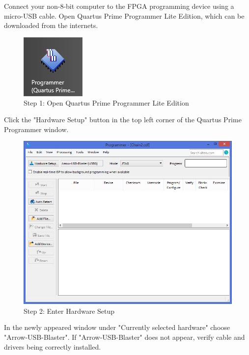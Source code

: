 Connect your non-8-bit computer to the FPGA programming device using a micro-USB cable.
Open Quartus Prime Programmer Lite Edition, which can be downloaded from the internets.

\begin{figure}
  \includegraphics{images/max10_01.png}
  \caption{Step 1: Open Quartus Prime Programmer Lite Edition}
  \label{fig:max10_01}
\end{figure}

Click the "Hardware Setup" button in the top left corner of the Quartus Prime Programmer window.

\begin{figure}
  \includegraphics[width=\linewidth]{images/max10_02.png}
  \caption{Step 2: Enter Hardware Setup}
  \label{fig:max10_02}
\end{figure}

In the newly appeared window under "Currently selected hardware" choose "Arrow-USB-Blaster".
If "Arrow-USB-Blaster" does not appear, verify cable and drivers being correctly installed.


